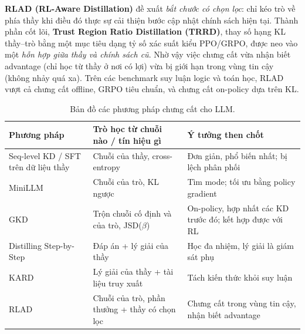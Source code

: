 \textbf{RLAD (RL-Aware Distillation)} đề xuất \emph{bắt chước có chọn lọc}: chỉ kéo trò về phía thầy khi điều đó thực sự cải thiện bước cập nhật chính sách hiện tại. Thành phần cốt lõi, \textbf{Trust Region Ratio Distillation (TRRD)}, thay số hạng KL thầy--trò bằng một mục tiêu dạng tỷ số xác suất kiểu PPO/GRPO, được neo vào một \emph{hỗn hợp giữa thầy và chính sách cũ}. Nhờ vậy việc chưng cất vừa nhận biết advantage (chỉ học từ thầy ở nơi có lợi) vừa bị giới hạn trong vùng tin cậy (không nhảy quá xa). Trên các benchmark suy luận logic và toán học, RLAD vượt cả chưng cất offline, GRPO tiêu chuẩn, và chưng cất on-policy dựa trên KL.

\begin{table}[H]
\centering
\caption{Bản đồ các phương pháp chưng cất cho LLM.}
\label{tab:llm_distillation_map}
\begin{tabularx}{\textwidth}{@{}lXX@{}}
\toprule
\textbf{Phương pháp} & \textbf{Trò học từ chuỗi nào / tín hiệu gì} & \textbf{Ý tưởng then chốt} \\
\midrule
Seq-level KD / SFT trên dữ liệu thầy & Chuỗi của thầy, cross-entropy & Đơn giản, phổ biến nhất; bị lệch phân phối \\
MiniLLM & Chuỗi của trò, KL ngược & Tìm mode; tối ưu bằng policy gradient \\
GKD & Trộn chuỗi cố định và của trò, JSD($\beta$) & On-policy, hợp nhất các KD trước đó; kết hợp được với RL \\
Distilling Step-by-Step & Đáp án + lý giải của thầy & Học đa nhiệm, lý giải là giám sát phụ \\
KARD & Lý giải của thầy + tài liệu truy xuất & Tách kiến thức khỏi suy luận \\
RLAD & Chuỗi của trò, phần thưởng + thầy có chọn lọc & Chưng cất trong vùng tin cậy, nhận biết advantage \\
\bottomrule
\end{tabularx}
\end{table}
